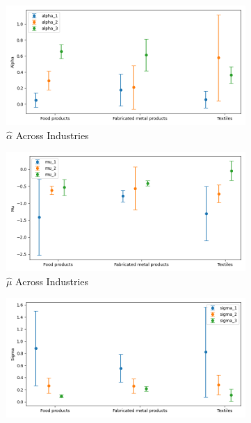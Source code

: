\documentclass{article}
\begin{document}
\begin{figure}[ht!]
    \centering 
    \caption{AR(1) Normal Model Across Industries}
    \begin{subfigure}[t]{0.32\textwidth}
        \centering
        \includegraphics[width=\textwidth]{figure/ar1_normal_alpha_across_industries_m3.png}
        \caption{$\hat\alpha$ Across Industries}
    \end{subfigure}
    \begin{subfigure}[t]{0.32\textwidth}
        \centering
        \includegraphics[width=\textwidth]{figure/ar1_normal_mu_across_industries_m3.png}
        \caption{$\hat\mu$ Across Industries}
    \end{subfigure}
    \begin{subfigure}[t]{0.32\textwidth}
        \centering
        \includegraphics[width=\textwidth]{figure/ar1_normal_sigma_across_industries_m3.png}

\end{subfigure}
\end{figure}
\end{document}
